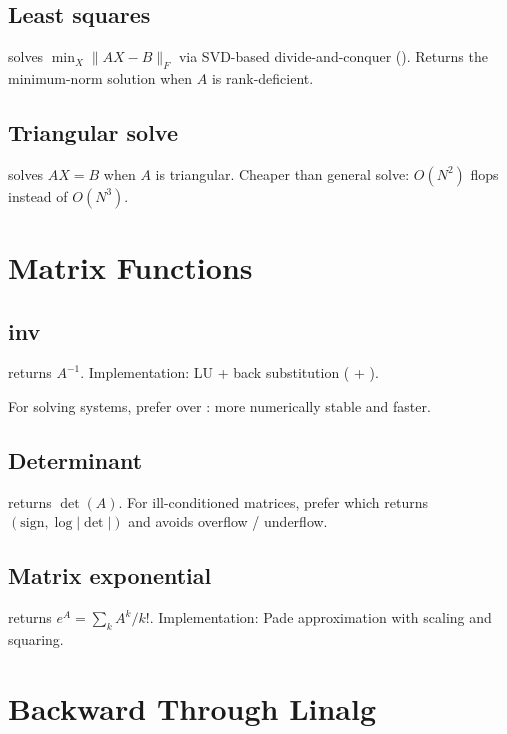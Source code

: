 \subsection{Least squares}
\label{ssec:linalg:lstsq}

 solves $\min_X \|AX - B\|_F$ via SVD-based
divide-and-conquer (). Returns the minimum-norm
solution when $A$ is rank-deficient.

\subsection{Triangular solve}
\label{ssec:linalg:triangular_solve}

 solves $AX = B$ when
$A$ is triangular. Cheaper than general solve: $O(N^2)$ flops
instead of $O(N^3)$.

\section{Matrix Functions}
\label{sec:linalg:matrix_functions}

\subsection{inv}
\label{ssec:linalg:inv}

 returns $A^{-1}$. Implementation: LU + back
substitution ( + ).

For solving systems, prefer  over : more numerically stable and faster.

\subsection{Determinant}
\label{ssec:linalg:det}

 returns $\det(A)$. For ill-conditioned matrices,
prefer  which returns $(\text{sign},
\log|\det|)$ and avoids overflow / underflow.

\subsection{Matrix exponential}
\label{ssec:linalg:matrix_exp}

 returns $e^A = \sum_{k} A^k / k!$.
Implementation: Pade approximation with scaling and squaring.

\section{Backward Through Linalg}
\label{sec:linalg:backward}

